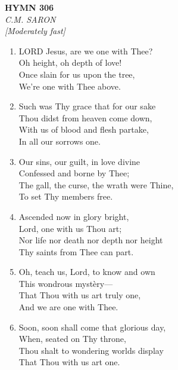 \newpage
\begin{center}
    {\Large \textbf{HYMN 306}}
    \\
    \textit{C.M. SARON}
    \\
    \textit{\small [Moderately fast]}
\end{center}
\vspace{1em}

\begin{enumerate}
    \item LORD Jesus, are we one with Thee? \\
        Oh height, oh depth of love! \\
        Once slain for us upon the tree, \\
        We're one with Thee above.

    \item Such was Thy grace that for our sake \\
        Thou didst from heaven come down, \\
        With us of blood and flesh partake, \\
        In all our sorrows one.

    \item Our sins, our guilt, in love divine \\
        Confessed and borne by Thee; \\
        The gall, the curse, the wrath were Thine, \\
        To set Thy members free.

    \item Ascended now in glory bright, \\
        Lord, one with us Thou art; \\
        Nor life nor death nor depth nor height \\
        Thy saints from Thee can part.

    \item Oh, teach us, Lord, to know and own \\
        This wondrous myst\`ery--- \\
        That Thou with us art truly one, \\
        And we are one with Thee.

    \item Soon, soon shall come that glorious day, \\
        When, seated on Thy throne, \\
        Thou shalt to wondering worlds display \\
        That Thou with us art one.

\end{enumerate}

